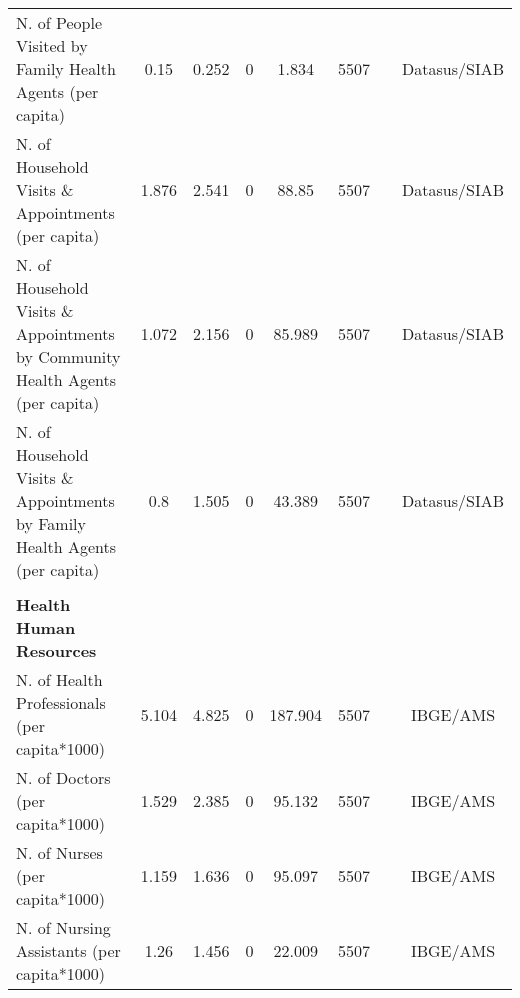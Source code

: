 \begin{table}[H]
\begin{footnotesize}
\begin{center}
{\begin{threeparttable}[b]
\begin{tabular}{rrrrrrrr}
    \multicolumn{1}{l}{N. of People Visited by Family Health Agents (per capita)} & \multicolumn{1}{c}{0.15} & \multicolumn{1}{c}{0.252} & \multicolumn{1}{c}{0} & \multicolumn{1}{c}{1.834} & \multicolumn{1}{c}{5507} &       & \multicolumn{1}{c}{Datasus/SIAB} \\
    \multicolumn{1}{l}{N. of Household Visits \& Appointments (per capita)} & \multicolumn{1}{c}{1.876} & \multicolumn{1}{c}{2.541} & \multicolumn{1}{c}{0} & \multicolumn{1}{c}{88.85} & \multicolumn{1}{c}{5507} &       & \multicolumn{1}{c}{Datasus/SIAB} \\
    \multicolumn{1}{l}{N. of Household Visits \& Appointments by Community Health Agents (per capita)} & \multicolumn{1}{c}{1.072} & \multicolumn{1}{c}{2.156} & \multicolumn{1}{c}{0} & \multicolumn{1}{c}{85.989} & \multicolumn{1}{c}{5507} &       & \multicolumn{1}{c}{Datasus/SIAB} \\
    \multicolumn{1}{l}{N. of Household Visits \& Appointments by Family Health Agents (per capita)} & \multicolumn{1}{c}{0.8} & \multicolumn{1}{c}{1.505} & \multicolumn{1}{c}{0} & \multicolumn{1}{c}{43.389} & \multicolumn{1}{c}{5507} &       & \multicolumn{1}{c}{Datasus/SIAB} \\
          &       &       &       &       &       &       &  \\
    \multicolumn{1}{l}{\textbf{Health Human Resources}} &       &       &       &       &       &       &  \\
    \multicolumn{1}{l}{N. of Health Professionals (per capita*1000)} & \multicolumn{1}{c}{5.104} & \multicolumn{1}{c}{4.825} & \multicolumn{1}{c}{0} & \multicolumn{1}{c}{187.904} & \multicolumn{1}{c}{5507} &       & \multicolumn{1}{c}{IBGE/AMS} \\
    \multicolumn{1}{l}{N. of Doctors (per capita*1000)} & \multicolumn{1}{c}{1.529} & \multicolumn{1}{c}{2.385} & \multicolumn{1}{c}{0} & \multicolumn{1}{c}{95.132} & \multicolumn{1}{c}{5507} &       & \multicolumn{1}{c}{IBGE/AMS} \\
    \multicolumn{1}{l}{N. of Nurses (per capita*1000)} & \multicolumn{1}{c}{1.159} & \multicolumn{1}{c}{1.636} & \multicolumn{1}{c}{0} & \multicolumn{1}{c}{95.097} & \multicolumn{1}{c}{5507} &       & \multicolumn{1}{c}{IBGE/AMS} \\
    \multicolumn{1}{l}{N. of Nursing Assistants (per capita*1000)} & \multicolumn{1}{c}{1.26} & \multicolumn{1}{c}{1.456} & \multicolumn{1}{c}{0} & \multicolumn{1}{c}{22.009} & \multicolumn{1}{c}{5507} &       & \multicolumn{1}{c}{IBGE/AMS} \\

\end{tabular}
\end{threeparttable}}
\end{center}
\end{footnotesize}
\end{table}
